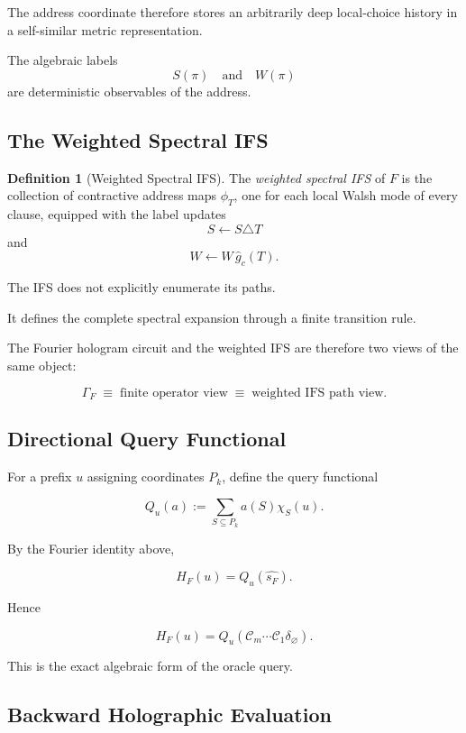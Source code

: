 \documentclass[11pt]{article}
\theoremstyle{plain}
\theoremstyle{definition}
\newtheorem{definition}[theorem]{Definition}
\begin{document}
The address coordinate therefore stores an arbitrarily deep local-choice
history in a self-similar metric representation.

The algebraic labels
\[
    S(\pi)
    \quad\text{and}\quad
    W(\pi)
\]
are deterministic observables of the address.

\subsection{The Weighted Spectral IFS}

\begin{definition}[Weighted Spectral IFS]
\label{def:weighted-spectral-ifs}
The \emph{weighted spectral IFS} of \(F\) is the collection of contractive
address maps \(\phi_T\), one for each local Walsh mode of every clause,
equipped with the label updates
\[
    S\leftarrow S\triangle T
\]
and
\[
    W\leftarrow W\,\widehat g_c(T).
\]
\end{definition}

The IFS does not explicitly enumerate its paths.

It defines the complete spectral expansion through a finite transition rule.

The Fourier hologram circuit and the weighted IFS are therefore two views of
the same object:

\[
\boxed{
\Gamma_F
\;\equiv\;
\text{finite operator view}
\;\equiv\;
\text{weighted IFS path view}.
}
\]

\subsection{Directional Query Functional}

For a prefix \(u\) assigning coordinates \(P_k\), define the query functional

\[
    Q_u(a)
    :=
    \sum_{S\subseteq P_k}
    a(S)\chi_S(u).
\]

By the Fourier identity above,

\[
    H_F(u)
    =
    Q_u(\widehat{s_F}).
\]

Hence

\[
\boxed{
H_F(u)
=
Q_u
\left(
    \mathcal{C}_m
    \cdots
    \mathcal{C}_1
    \delta_{\varnothing}
\right).
}
\]

This is the exact algebraic form of the oracle query.

\subsection{Backward Holographic Evaluation}
\end{document}

